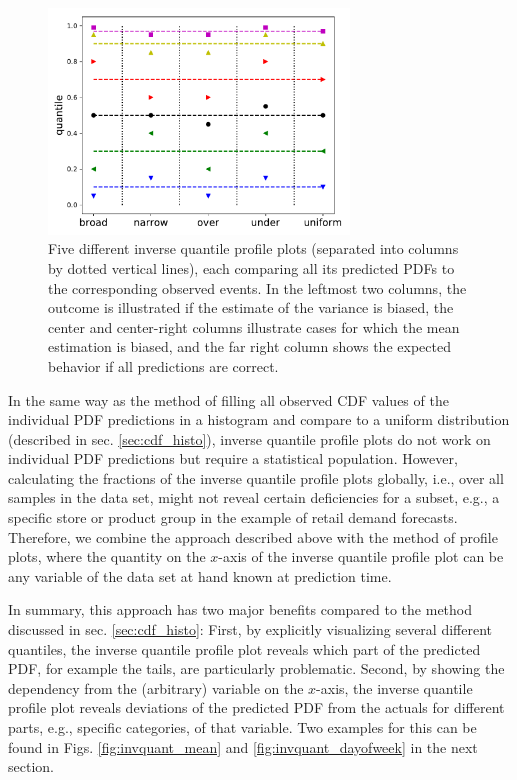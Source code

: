 \documentclass[BCOR=1mm, DIV=calc,10pt,
twoside=true,
twocolumn,
headings=normal]{scrartcl}
\begin{document}
\begin{figure}
\begin{center}
\includegraphics[width=8cm]{figs/invquant_example}
\caption{\label{fig:invquant_example} Five different inverse quantile profile plots (separated into columns by dotted vertical lines), each comparing all its predicted PDFs to the corresponding observed events. In the leftmost two columns, the outcome is illustrated if the estimate of the variance is biased, the center and center-right columns illustrate cases for which the mean estimation is biased, and the far right column shows the expected behavior if all predictions are correct.}
\end{center}
\end{figure}

In the same way as the method of filling all observed CDF values of the individual PDF predictions in a histogram and compare to a uniform distribution (described in sec. \ref{sec:cdf_histo}), inverse quantile profile plots do not work on individual PDF predictions but require a statistical population. However, calculating the fractions of the inverse quantile profile plots globally, i.e., over all samples in the data set, might not reveal certain deficiencies for a subset, e.g., a specific store or product group in the example of retail demand forecasts. Therefore, we combine the approach described above with the method of profile plots, where the quantity on the $x$-axis of the inverse quantile profile plot can be any variable of the data set at hand known at prediction time.

In summary, this approach has two major benefits compared to the method discussed in sec. \ref{sec:cdf_histo}: First, by explicitly visualizing several different quantiles, the inverse quantile profile plot reveals which part of the predicted PDF, for example the tails, are particularly problematic. Second, by showing the dependency from the (arbitrary) variable on the $x$-axis, the inverse quantile profile plot reveals deviations of the predicted PDF from the actuals for different parts, e.g., specific categories, of that variable. Two examples for this can be found in Figs. \ref{fig:invquant_mean} and \ref{fig:invquant_dayofweek} in the next section.
\end{document}
